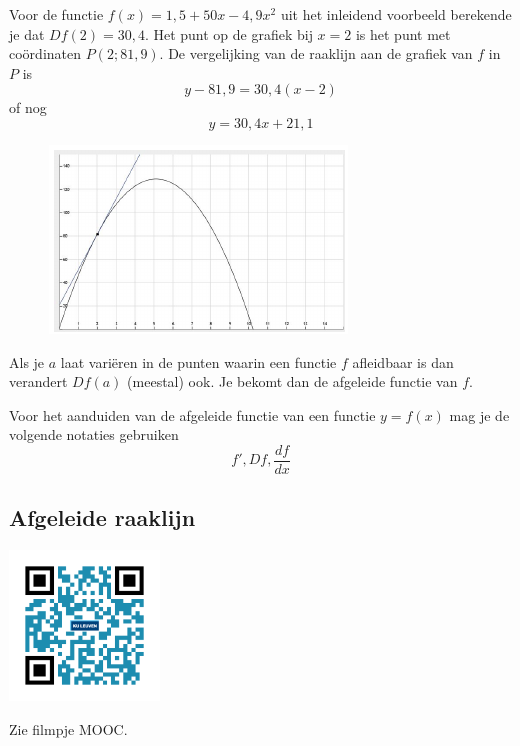 \begin{voorbeeld}
	Voor de functie $f(x)=1,5+50 x -4,9 x^2$ uit het inleidend voorbeeld berekende je dat $Df(2)=30,4$.
	Het punt op de grafiek bij $x=2$ is het punt met co\"ordinaten $P(2;81,9)$.
	De vergelijking van de raaklijn aan de grafiek van $f$ in $P$ is
	\[
	y-81,9=30,4(x-2)
	\]
	of nog
	\[
	y=30,4x+21,1
	\]
	
	\begin{figure}[h]
		\begin{center}
			\includegraphics[height=5 cm]{6_afgeleiden_integralen/inputs/grafTang.JPG}
		\end{center}
	\end{figure}
\end{voorbeeld}\vspace{0,5 cm}

\begin{definitie}
	Als je $a$ laat vari\"eren in de punten waarin een functie $f$ afleidbaar is dan verandert $Df(a)$ (meestal) ook.
	Je bekomt dan de afgeleide functie van $f$.
\end{definitie}

\begin{notatie}
Voor het aanduiden van de afgeleide functie van een functie $y=f(x)$ mag je de volgende notaties gebruiken
\[f',Df,\frac{df}{dx}\]
\end{notatie}

\subsection{Afgeleide raaklijn}

\begin{minipage}{.25\linewidth}
	\raggedright
	\includegraphics[width=4cm]{6_afgeleiden_integralen/inputs/QR_Code_AFGRAAKLIJN_module6}
\end{minipage}
\begin{minipage}{.7\linewidth}
	Zie filmpje MOOC.
\end{minipage}

